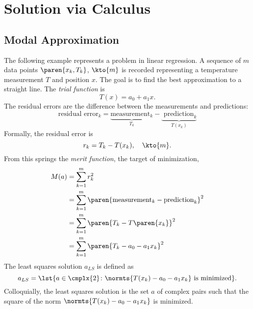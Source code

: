 \chapter{Solution via Calculus}

\section{Modal Approximation}  %
The following example represents a problem in linear regression. A sequence of $m$ data points $\paren{x_{k}, T_{k}}$,  $\kto{m}$  is recorded representing a temperature measurement $T$ and position $x$. The goal is to find the best approximation to a straight line. The \emph{trial function} is
  \begin{equation*}   %
    T(x) = a_{0} + a_{1} x .
    \label{eq:lr trial}
  \end{equation*}
The residual errors are the difference between the measurements and predictions:\\
  \begin{equation*}   %
      \text{residual error}_{k} = \underbrace{\text{measurement}_{k}}_{T_{k}} - \underbrace{\text{ prediction}_{k}}_{T(x_{k})}
  \end{equation*}
Formally, the residual error is
  \begin{equation*}   %
    r_{k} = T_{k} - T(x_{k}), \quad \kto{m}.
  \end{equation*}
From this springs the \emph{merit function}, the target of minimization,
  \begin{equation}   %
  \begin{split}
    M(a) 
      &= \sum_{k=1}^{m} r_{k}^{2} \\
      &= \sum_{k=1}^{m} \paren{\text{measurement}_{k} - \text{prediction}_{k}}^{2} \\
      &= \sum_{k=1}^{m} \paren{T_{k} - T\paren{x_{k}}}^{2} \\
      &= \sum_{k=1}^{m} \paren{T_{k} - a_{0} - a_{1} x_{k}}^{2}
    \label{eqn:merit}
  \end{split}
  \end{equation}
The least squares solution $a_{LS}$ is defined as 
  \begin{equation*}   %
    a_{LS} = \lst{a \in \cmplx{2} \colon \normts{T(x_{k}) - a_{0} - a_{1} x_{k}} \text{ is minimized} }.
  \end{equation*}
Colloquially, the least squares solution is the set $a$ of complex pairs such that the square of the norm $\normts{T(x_{k}) - a_{0} - a_{1} x_{k}}$ is minimized.

